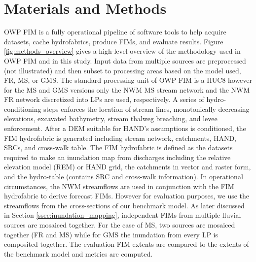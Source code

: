 \documentclass[draft]{dependencies/agujournal2019}
\begin{document}
\section{Materials and Methods}
%
OWP FIM is a fully operational pipeline of software tools to help acquire datasets, cache hydrofabrics, produce FIMs, and evaluate results.
Figure \ref{fig:methods_overview} gives a high-level overview of the methodology used in OWP FIM and in this study.
Input data from multiple sources are preprocessed (not illustrated) and then subset to processing areas based on the model used, FR, MS, or GMS.
The standard processing unit of OWP FIM is a HUC8 however for the MS and GMS versions only the NWM MS stream network and the NWM FR network discretized into LPs are used, respectively.
A series of hydro-conditioning steps enforces the location of stream lines, monotonically decreasing elevations, excavated bathymetry, stream thalweg breaching, and levee enforcement.
After a DEM suitable for HAND's assumptions is conditioned, the FIM hydrofabric is generated including stream network, catchments, HAND, SRCs, and cross-walk table.
The FIM hydrofabric is defined as the datasets required to make an inundation map from discharges including the relative elevation model (REM) or HAND grid, the catchments in vector and raster form, and the hydro-table (contains SRC and cross-walk information).
In operational circumstances, the NWM streamflows are used in conjunction with the FIM hydrofabric to derive forecast FIMs.
However for evaluation purposes, we use the streamflows from the cross-sections of our benchmark model.
As later discussed in Section \ref{ssec:inundation_mapping}, independent FIMs from multiple fluvial sources are mosaiced together.
For the case of MS, two sources are mosaiced together (FR and MS) while for GMS the inundation from every LP is composited together.
The evaluation FIM extents are compared to the extents of the benchmark model and metrics are computed.
%
\end{document}
